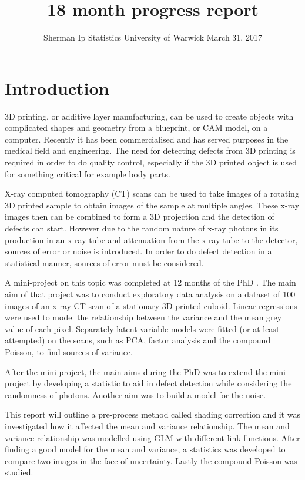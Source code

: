 \documentclass[a4paper]{proc}
\title{18 month progress report}
\author{Sherman Ip \quad Statistics \quad University of Warwick \quad March 31, 2017}
\begin{document}
\maketitle

\begin{abstract}

\end{abstract}

\section{Introduction}
3D printing, or additive layer manufacturing, can be used to create objects with complicated shapes and geometry from a blueprint, or CAM model, on a computer.  Recently it has been commercialised and has served purposes in the medical field and engineering. The need for detecting defects from 3D printing is required in order to do quality control, especially if the 3D printed object is used for something critical for example body parts. 

X-ray computed tomography (CT) scans can be used to take images of a rotating 3D printed sample to obtain images of the sample at multiple angles. These x-ray images then can be combined to form a 3D projection and the detection of defects can start. However due to the random nature of x-ray photons in its production in an x-ray tube and attenuation from the x-ray tube to the detector, sources of error or noise is introduced. In order to do defect detection in a statistical manner, sources of error must be considered.

A mini-project on this topic was completed at 12 months of the PhD \cite{ip2016inside}. The main aim of that project was to conduct exploratory data analysis on a dataset of 100 images of an x-ray CT scan of a stationary 3D printed cuboid. Linear regressions were used to model the relationship between the variance and the mean grey value of each pixel. Separately latent variable models were fitted (or at least attempted) on the scans, such as PCA, factor analysis and the compound Poisson, to find sources of variance.

After the mini-project, the main aims during the PhD was to extend the mini-project by developing a statistic to aid in defect detection while considering the randomness of photons. Another aim was to build a model for the noise.

This report will outline a pre-process method called shading correction and it was investigated how it affected the mean and variance relationship. The mean and variance relationship was modelled using GLM with different link functions. After finding a good model for the mean and variance, a statistics was developed to compare two images in the face of uncertainty. Lastly the compound Poisson was studied.
\end{document}
